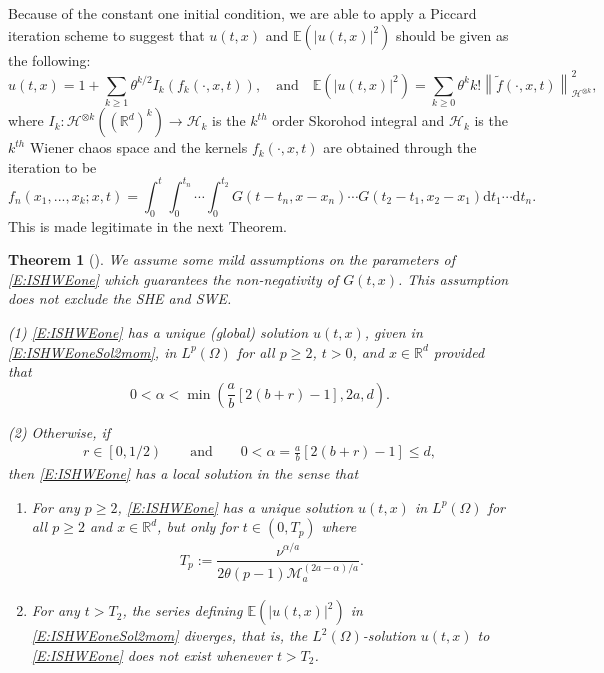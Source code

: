 \documentclass[a4paper,11pt]{article}
\numberwithin{equation}{section}
\theoremstyle{plain}
\newtheorem{theorem}{Theorem}[section]
\theoremstyle{definition}
\newcommand{\ud}{\ensuremath{\mathrm{d} }}
\newcommand{\Norm}[1]{\left\|  #1   \right\|}
\newcommand{\R}{\mathbb{R}}
\numberwithin{NQ}{section}
\numberwithin{LQ}{section}
\numberwithin{ZQ}{section}
\begin{document}
Because of the constant one initial condition, we are able to apply a Piccard iteration scheme to suggest that $u(t,x)$ and $\mathbb{E}(|u(t,x)|^2)$ should be given as the following:
	\begin{equation}
	\label{E:ISHWEoneSol2mom}
			u(t,x) = 1 + \sum_{k \ge 1}\theta^{k/2}I_k(f_k(\cdot,x,t)), \quad \text{and} \quad 	\mathbb{E}(|u(t,x)|^2) = \sum_{k \ge 0} \theta^k k! \Norm{\tilde{f}(\cdot,x,t)}^2_{\mathcal{H}^{\otimes k }},
	\end{equation}
where $I_k : \mathcal{H}^{\otimes k}\left((\R^d)^k\right) \to \mathcal{H}_k$ is the $k^{th}$ order Skorohod integral and $\mathcal{H}_k$ is the $k^{th}$ Wiener chaos space and the kernels $f_k(\cdot,x,t)$ are obtained through the iteration to be
	\[
			f_n(x_1,...,x_k;x,t) = \int_0^t \int_0^{t_n}\cdots \int_0^{t_2} G(t-t_n,x-x_n)\cdots G(t_2-t_1,x_2-x_1) \ud t_1\cdots \ud t_n.
	\]
This is made legitimate in the next Theorem. 
	\begin{theorem}[]
	\label{T:ISHWEoneSolv}  
We assume some mild assumptions on the parameters of \eqref{E:ISHWEone} which guarantees the non-negativity of $G(t,x)$. This assumption does not exclude the SHE and SWE.

\noindent (1) \eqref{E:ISHWEone} has a unique (global) solution $u(t,x)$, given in \eqref{E:ISHWEoneSol2mom}, in $L^p(\Omega)$ for all $p \ge 2$,
$t>0$, and $x \in \R^d$ provided that
	\begin{equation}
	\label{E:alpha}
	0< \alpha < \min\left( \frac{a}{b}\left[2(b+r)-1\right], 2a, d \right).
	\end{equation}
		
\noindent (2) Otherwise, if
	\begin{align}
	\label{E:critical}
		r\in \left[0,1/2\right) \qquad \text{and} \qquad
		0<\alpha = \frac{a}{b}[2(b+r)-1] \le d,
	\end{align}
then \eqref{E:ISHWEone} has a local solution in the sense that
		\begin{enumerate}
			\item[(2-i)] For any $p\ge 2$, \eqref{E:ISHWEone} has a unique solution $u(t,x)$ in $L^p(\Omega)$ for
			all $p \ge 2$ and $x \in \R^d$, but only for $t\in (0, T_p)$ where
			\begin{align}
			\label{E:Tp}
			T_p := \dfrac{\nu^{\alpha/a}}{2 \theta (p-1) \mathcal{M}_a^{(2a-\alpha)/a}}.
			\end{align}
			\item[(2-ii)] For any $t>T_2$, the series defining $\mathbb{E}\left(|u(t,x)|^2\right)$ in \eqref{E:ISHWEoneSol2mom} diverges, that is, the $L^2(\Omega)$-solution $u(t,x)$ to \eqref{E:ISHWEone} does not exist whenever $t>T_2$.
		\end{enumerate}
	\end{theorem}
\end{document}
